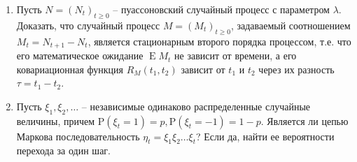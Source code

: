 \documentclass[a4paper,12pt]{extreport}
\renewcommand{\=}[1]{\stackrel{#1}{=}} %
\newcommand{\Expect}{\mathop{{}\mathrm{E}}}
\newcommand{\Proba}{\mathrm{P}}
\newcommand{\generaltime}{t \geqslant 0}
\newcommand{\newprocess}[1]{
    \ensuremath{
        #1 = \left(#1 _t\right)_{\generaltime}
    }
}
\begin{document}
\begin{enumerate}


    \item Пусть $\newprocess{N}$ -- пуассоновский случайный
    процесс с параметром $\lambda$. Доказать, что случайный
    процесс $\newprocess{M}$, задаваемый соотношением
    $M_t = N_{t+1} - N_t$, является стационарным второго порядка
    процессом, т.е. что его математическое ожидание $\Expect M_t$
    не зависит от времени, а его ковариационная функция
    $R_M(t_1, t_2)$ зависит от $t_1$ и $t_2$ через их разность
    $\tau = t_1 - t_2$.




    \item Пусть $\xi_1, \xi_2, \ldots$ -- независимые одинаково
    распределенные случайные величины, причем
    $\Proba (\xi_t = 1) = p, \Proba (\xi_t = -1) = 1 - p$.
    Является ли цепью Маркова последовательность
    $\eta_t = \xi_1 \xi_2 \ldots \xi_t$? Если да, 
    найти ее вероятности перехода за один шаг.


\end{enumerate}
\end{document}
